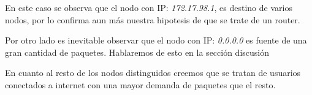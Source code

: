 En este caso se observa que el nodo con IP: \textit{172.17.98.1}, es destino de varios nodos, por lo confirma aun más nuestra hipotesis de que se trate de un router.

Por otro lado es inevitable observar que el nodo con IP: \textit{0.0.0.0} es fuente de una gran cantidad de paquetes. Hablaremos de esto en la sección discusión 

En cuanto al resto de los nodos distinguidos creemos que se tratan de usuarios conectados a internet con una mayor demanda de paquetes que el resto.
